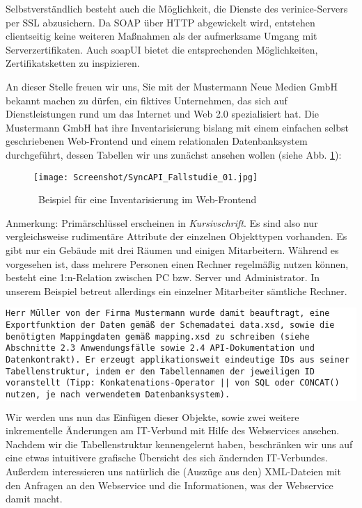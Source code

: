 \documentclass[a4paper,10pt]{book}
\begin{document}
Selbstverständlich besteht auch die Möglichkeit, die Dienste des
verinice-Servers per SSL abzusichern. Da SOAP über HTTP abgewickelt wird,
entstehen clientseitig keine weiteren Maßnahmen als der aufmerksame Umgang mit
Serverzertifikaten. Auch soapUI bietet die entsprechenden Möglichkeiten,
Zertifikatsketten zu inspizieren.

An dieser Stelle freuen wir uns, Sie mit der Mustermann Neue Medien GmbH bekannt machen zu dürfen, ein fiktives Unternehmen, das sich auf Dienstleistungen rund um das Internet und Web 2.0 spezialisiert hat. Die Mustermann GmbH hat ihre Inventarisierung bislang mit einem einfachen selbst geschriebenen Web-Frontend und einem
relationalen Datenbanksystem durchgeführt, dessen Tabellen wir uns zunächst ansehen wollen (siehe Abb. \ref{Beispiel fuer eine Inventarisierung im Web-Frontend}):
\newline
\begin{figure}[htb!]
  \centering
  \texttt{[image: Screenshot/SyncAPI\_Fallstudie\_01.jpg]}
  \caption{\label{Beispiel fuer eine Inventarisierung im Web-Frontend} \ Beispiel für eine Inventarisierung im Web-Frontend}
\end{figure}
\newline
Anmerkung: Primärschlüssel erscheinen in \textit{Kursivschrift}.
\newline
Es sind also nur vergleichsweise rudimentäre Attribute der einzelnen Objekttypen vorhanden. Es gibt nur ein
Gebäude mit drei Räumen und einigen Mitarbeitern. Während es vorgesehen ist, dass mehrere Personen einen Rechner
regelmäßig nutzen können, besteht eine 1:n-Relation zwischen PC bzw. Server und Administrator. In unserem
Beispiel betreut allerdings ein einzelner Mitarbeiter sämtliche Rechner.
\newline\newline
\colorbox{white}{\parbox{\textwidth}{
{\tt Herr Müller von der Firma Mustermann wurde damit beauftragt, eine Exportfunktion der Daten gemäß der Schemadatei data.xsd, sowie die benötigten
Mappingdaten gemäß mapping.xsd zu schreiben (siehe Abschnitte 2.3 Anwendungsfälle sowie 2.4 API-Dokumentation und Datenkontrakt).
Er erzeugt applikationsweit eindeutige IDs aus seiner Tabellenstruktur, indem er den Tabellennamen der jeweiligen ID voranstellt
(Tipp: Konkatenations-Operator || von SQL oder CONCAT() nutzen, je nach verwendetem Datenbanksystem).}
}}
\newline\newline
Wir werden uns nun das Einfügen dieser Objekte, sowie zwei weitere inkrementelle Änderungen am IT-Verbund mit
Hilfe des Webservices ansehen. Nachdem wir die Tabellenstruktur kennengelernt haben, beschränken wir uns auf
eine etwas intuitivere grafische Übersicht des sich ändernden IT-Verbundes. Außerdem interessieren uns natürlich
die (Auszüge aus den) XML-Dateien mit den Anfragen an den Webservice und die Informationen, was der Webservice damit macht.
\end{document}

